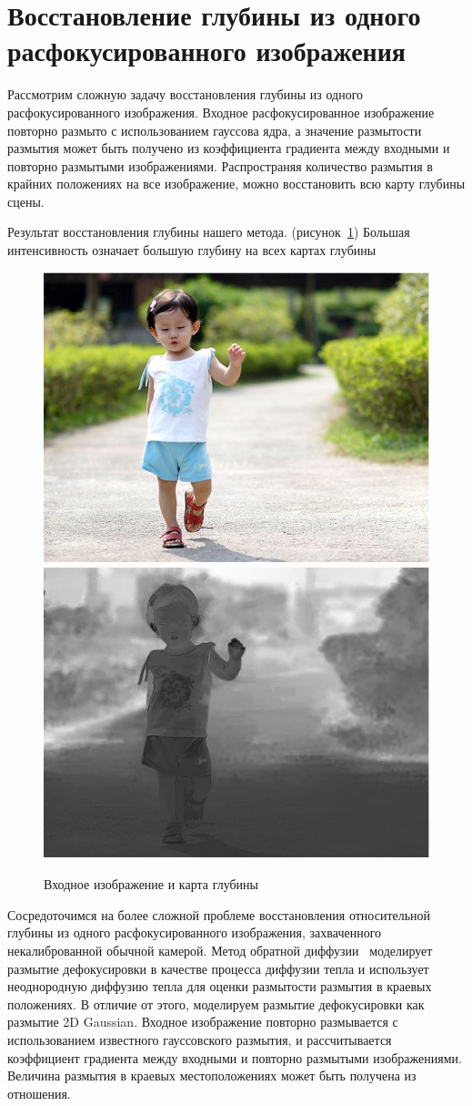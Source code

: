 
\section{Восстановление глубины из одного расфокусированного изображения}

Рассмотрим сложную задачу восстановления глубины из одного расфокусированного изображения. Входное расфокусированное изображение повторно размыто с использованием гауссова ядра, а значение размытости размытия может быть получено из коэффициента градиента между входными и повторно размытыми изображениями. Распространяя количество размытия в крайних положениях на все изображение, можно восстановить всю карту глубины сцены.

Результат восстановления глубины нашего метода. (рисунок~\ref{fig:input}) Большая интенсивность означает большую глубину на всех картах глубины

\begin{figure}[H]
	\centering
	\includegraphics[width=0.4\linewidth]{pics/input}
	\includegraphics[width=0.4\linewidth]{pics/depth_map}
	\caption{Входное изображение и карта глубины}
	\label{fig:input}
\end{figure}

Сосредоточимся на более сложной проблеме восстановления относительной глубины из одного расфокусированного изображения, захваченного некалиброванной обычной камерой. Метод обратной диффузии~\cite{Proc} моделирует размытие дефокусировки в качестве процесса диффузии тепла и использует неоднородную диффузию тепла для оценки размытости размытия в краевых положениях. В отличие от этого, моделируем размытие дефокусировки как размытие 2D Gaussian. Входное изображение повторно размывается с использованием известного гауссовского размытия, и рассчитывается коэффициент градиента между входными и повторно размытыми изображениями. Величина размытия в краевых местоположениях может быть получена из отношения.


